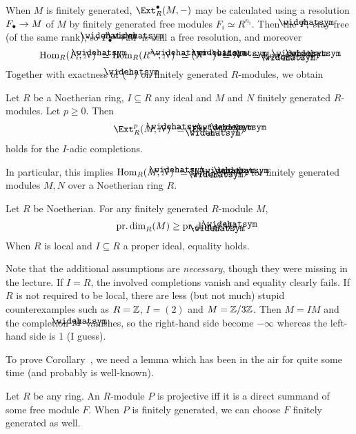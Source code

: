 \documentclass[a4paper,parskip=half,numbers=enddot, DIV=12]{scrreprt}
\begin{document}
When $M$ is finitely generated, $\Ext_R^\bullet(M,-)$ may be calculated using a resolution $F_\bullet \morphism M$ of $M$ by finitely generated free modules $F_i\simeq R^{n_i}$. Then the $\roof{F}_i$ stay free (of the same rank), so $\roof{F}_\bullet\morphism \roof{M}$ is still a free resolution, and moreover
\begin{align*}
	\Hom_R(F_i,N)\roof{\phantom{)}}\simeq \Hom_R(R^{n_i},N)\roof{\phantom{)}}\simeq (N^{n_i})\roof{\phantom{)}}\simeq \roof{N}^{n_i}\simeq \Hom_{\roof{R}}(\roof{F_i},\roof{N})
\end{align*}
Together with exactness of $\roof{(-)}$ on finitely generated $R$-modules, we obtain
\begin{prop}
	Let $R$ be a Noetherian ring, $I\subseteq R$ any ideal and $M$ and $N$ finitely generated $R$-modules. Let $p\geq 0$. Then
	\begin{align*}
		\Ext_R^p(M,N)\roof{\phantom{)}}\simeq \Ext_{\roof{R}}^p(\roof{M},\roof{N})
	\end{align*}
	holds for the $I$-adic completions.
\end{prop}
In particular, this implies $\Hom_R(M,N)\roof{\phantom{)}}\simeq\Hom_{\roof{R}}(\roof{M},\roof{N})$ for finitely generated modules $M,N$ over a Noetherian ring $R$.
\begin{cor}
	Let $R$ be Noetherian. For any finitely generated $R$-module $M$, 
	\begin{align*}		
		\pdim_R(M)\geq\pdim_{\roof{R}}(\roof{M})\;.
	\end{align*}
	When $R$ is local and $I\subseteq R$ a proper ideal, equality holds.
\end{cor}
\begin{rem*}
	Note that the additional assumptions are \emph{necessary}, though they were missing in the lecture. If $I=R$, the involved completions vanish and equality clearly fails. If $R$ is not required to be local, there are less (but not much) stupid counterexamples such as $R=\mathbb{Z}$, $I=(2)$ and $M=\mathbb{Z}/3\mathbb{Z}$. Then $M=IM$ and the completion $\roof{M}$ vanishes, so the right-hand side become $-\infty$ whereas the left-hand side is $1$ (I guess).
\end{rem*}
To prove Corollary~, we need a lemma which has been in the air for quite some time (and probably is well-known).
\begin{lem}
	Let $R$ be any ring. An $R$-module $P$ is projective iff it is a direct summand of some free module $F$. When $P$ is finitely generated, we can choose $F$ finitely generated as well.
\end{lem}
\end{document}
